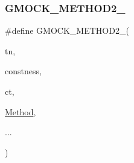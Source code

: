 \subsubsection{\texorpdfstring{G\+M\+O\+C\+K\+\_\+\+M\+E\+T\+H\+O\+D2\+\_\+}{GMOCK\_METHOD2\_}}
{\footnotesize\ttfamily \#define G\+M\+O\+C\+K\+\_\+\+M\+E\+T\+H\+O\+D2\+\_\+(\begin{DoxyParamCaption}\item[{}]{tn,  }\item[{}]{constness,  }\item[{}]{ct,  }\item[{}]{\hyperlink{gmock-spec-builders__test_8cc_a95606368148f3e5aab5db46c32466afd}{Method},  }\item[{}]{... }\end{DoxyParamCaption})}

